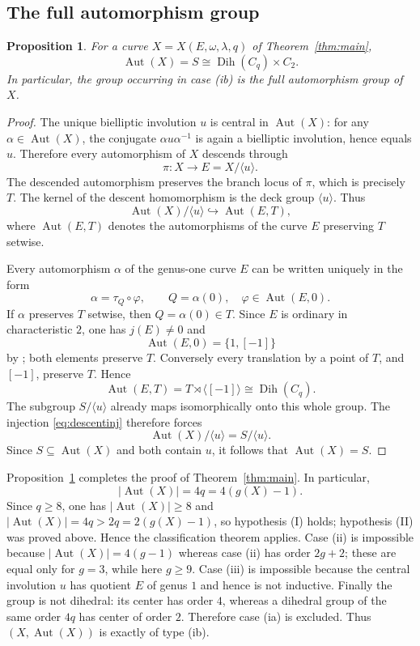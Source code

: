\documentclass[11pt]{article}
\newtheorem{proposition}[theorem]{Proposition}
\theoremstyle{remark}
\newcommand{\Aut}{\operatorname{Aut}}
\newcommand{\Dih}{\operatorname{Dih}}
\begin{document}
\subsection{The full automorphism group}

\begin{proposition}\label{prop:fullaut}
For a curve $X=X(E,\omega,\lambda,q)$ of Theorem~\ref{thm:main},
\[
 \Aut(X)=S\cong \Dih(C_q)\times C_2.
\]
In particular, the group occurring in case \textup{(ib)} is the full
automorphism group of $X$.
\end{proposition}

\begin{proof}
The unique bielliptic involution $u$ is central in $\Aut(X)$: for any
$\alpha\in\Aut(X)$, the conjugate $\alpha u\alpha^{-1}$ is again a
bielliptic involution, hence equals $u$.  Therefore every automorphism of
$X$ descends through
\[
 \pi:X\longrightarrow E=X/\langle u\rangle.
\]
The descended automorphism preserves the branch locus of $\pi$, which is
precisely $T$.  The kernel of the descent homomorphism is the deck group
$\langle u\rangle$.  Thus
\begin{equation}\label{eq:descentinj}
 \Aut(X)/\langle u\rangle\hookrightarrow \Aut(E,T),
\end{equation}
where $\Aut(E,T)$ denotes the automorphisms of the curve $E$ preserving
$T$ setwise.

Every automorphism $\alpha$ of the genus-one curve $E$ can be written
uniquely in the form
\[
 \alpha=\tau_Q\circ\varphi,
 \qquad Q=\alpha(0),\quad \varphi\in\Aut(E,0).
\]
If $\alpha$ preserves $T$ setwise, then $Q=\alpha(0)\in T$.  Since $E$
is ordinary in characteristic $2$, one has $j(E)\ne0$ and
\[
 \Aut(E,0)=\{1,[-1]\}
\]
by \cite[Theorem~III.10.1]{Silverman}; both elements preserve
$T$.  Conversely every translation by a point of $T$, and $[-1]$, preserve
$T$.  Hence
\[
 \Aut(E,T)=T\rtimes\langle[-1]\rangle
 \cong\Dih(C_q).
\]
The subgroup $S/\langle u\rangle$ already maps isomorphically onto this
whole group.  The injection \eqref{eq:descentinj} therefore forces
\[
 \Aut(X)/\langle u\rangle=S/\langle u\rangle.
\]
Since $S\subseteq\Aut(X)$ and both contain $u$, it follows that
$\Aut(X)=S$.
\end{proof}

Proposition~\ref{prop:fullaut} completes the proof of Theorem~\ref{thm:main}.  In particular,
\[
 |\Aut(X)|=4q=4(g(X)-1).
\]
Since $q\ge8$, one has $|\Aut(X)|\ge8$ and
$|\Aut(X)|=4q>2q=2(g(X)-1)$, so hypothesis \textup{(I)} holds; hypothesis
\textup{(II)} was proved above.  Hence the classification theorem applies.  Case \textup{(ii)} is
impossible because $|\Aut(X)|=4(g-1)$ whereas case \textup{(ii)} has
order $2g+2$; these are equal only for $g=3$, while here $g\ge9$.
Case \textup{(iii)} is impossible because the central involution $u$
has quotient $E$ of genus $1$ and hence is not inductive.  Finally the group is not dihedral: its center has order $4$, whereas
a dihedral group of the same order $4q$ has center of order $2$.
Therefore case \textup{(ia)} is excluded.  Thus
$(X,\Aut(X))$ is exactly of type \textup{(ib)}.
\end{document}
